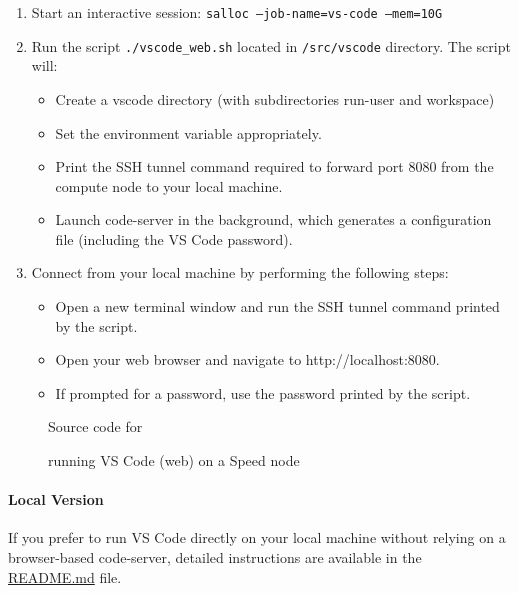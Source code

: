\begin{enumerate}
    \item Start an interactive session: \texttt{salloc --job-name=vs-code --mem=10G}
    \item Run the script \texttt{./vscode\_web.sh} located in \texttt{/src/vscode} directory. The script will:
    \begin{itemize}
        \item Create a vscode directory (with subdirectories run-user and workspace)
        \item Set the environment variable  appropriately.
        \item Print the SSH tunnel command required to forward port 8080 from the compute node to your local machine.
        \item Launch code-server in the background, which generates a configuration file (including the VS Code password).
    \end{itemize}
    \item Connect from your local machine by performing the following steps:
    \begin{itemize}
        \item Open a new terminal window and run the SSH tunnel command printed by the script.
        \item Open your web browser and navigate to http://localhost:8080.
        \item If prompted for a password, use the password printed by the script.
    \end{itemize}
\end{enumerate}

\small
\begin{figure}[htpb]
    
    \caption{Source code for }
    \label{fig:vscode_web.sh}
\end{figure}
\normalsize

\begin{figure}[htbp]
	\centering
	\caption{running VS Code (web) on a Speed node}
	\label{fig:vscode}
\end{figure}

\paragraph{Local Version}
\label{sect:local-vscode}
If you prefer to run VS Code directly on your local machine without relying on a browser-based code-server, 
detailed instructions are available in the  \href{https://github.com/NAG-DevOps/speed-hpc/blob/master/src/vscode}{README.md} file.

